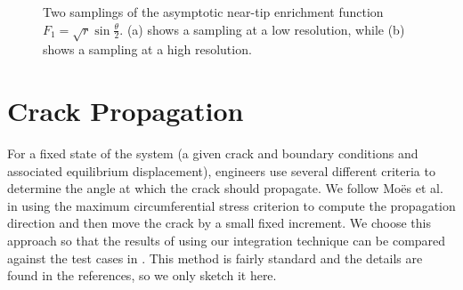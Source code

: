 \setlength{\figurewidth}{0.50\textwidth}
\begin{figure}[htbp]
\centering
{}
\caption{Two samplings of the asymptotic near-tip enrichment function $F_1 = \sqrt{r} \sin \frac{\theta}{2}$. (a) shows a sampling at a low resolution, while (b) shows a sampling at a high resolution.}
\label{fig:chap1.sampling}
\end{figure}

\section{Crack Propagation} \label{sec:chap1.propagation}

For a fixed state of the system (a given crack and boundary conditions and associated equilibrium displacement), engineers use several different criteria to determine the angle at which the crack should propagate. We follow Mo\"{e}s et al. \cite{Moes99} in using the maximum circumferential stress criterion to compute the propagation direction and then move the crack by a small fixed increment. We choose this approach so that the results of using our integration technique can be compared against the test cases in \cite{Moes99}. This method is fairly standard and the details are found in the references, so we only sketch it here.

